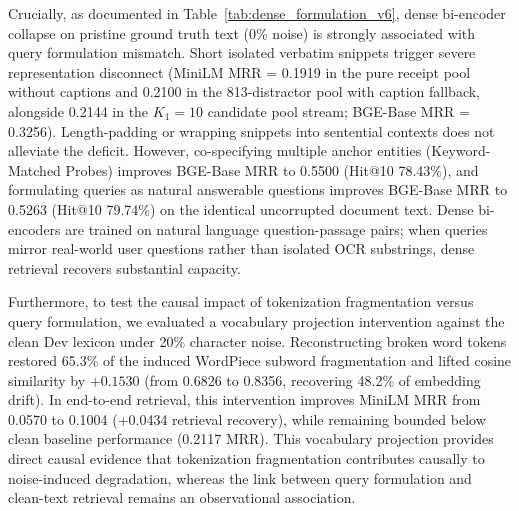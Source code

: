 Crucially, as documented in Table~\ref{tab:dense_formulation_v6}, dense bi-encoder collapse on pristine ground truth text ($0\%$ noise) is strongly associated with query formulation mismatch. Short isolated verbatim snippets trigger severe representation disconnect (MiniLM MRR = 0.1919 in the pure receipt pool without captions and 0.2100 in the 813-distractor pool with caption fallback, alongside 0.2144 in the $K_1=10$ candidate pool stream; BGE-Base MRR = 0.3256). Length-padding or wrapping snippets into sentential contexts does not alleviate the deficit. However, co-specifying multiple anchor entities (Keyword-Matched Probes) improves BGE-Base MRR to 0.5500 (Hit@10 78.43\%), and formulating queries as natural answerable questions improves BGE-Base MRR to 0.5263 (Hit@10 79.74\%) on the identical uncorrupted document text. Dense bi-encoders are trained on natural language question-passage pairs; when queries mirror real-world user questions rather than isolated OCR substrings, dense retrieval recovers substantial capacity.

Furthermore, to test the causal impact of tokenization fragmentation versus query formulation, we evaluated a vocabulary projection intervention against the clean Dev lexicon under 20\% character noise. Reconstructing broken word tokens restored 65.3\% of the induced WordPiece subword fragmentation and lifted cosine similarity by $+0.1530$ (from 0.6826 to 0.8356, recovering 48.2\% of embedding drift). In end-to-end retrieval, this intervention improves MiniLM MRR from 0.0570 to 0.1004 (+0.0434 retrieval recovery), while remaining bounded below clean baseline performance (0.2117 MRR). This vocabulary projection provides direct causal evidence that tokenization fragmentation contributes causally to noise-induced degradation, whereas the link between query formulation and clean-text retrieval remains an observational association.

